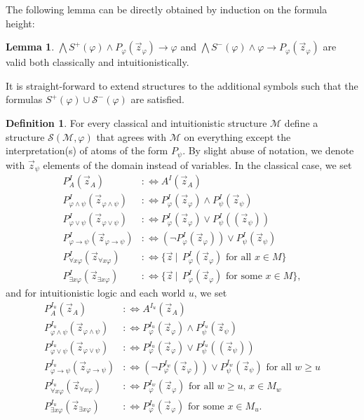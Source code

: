 \documentclass[a4paper,11pt]{report}
\theoremstyle{definition}
\theoremstyle{definition}
\theoremstyle{definition}
\newtheorem{lemma}[theorem]{Lemma}
\theoremstyle{definition}
\theoremstyle{definition}
\newtheorem{definition}[theorem]{Definition}
\theoremstyle{definition}
\theoremstyle{definition}
\begin{document}
	The following lemma can be directly obtained by induction on the formula height:
	
	\begin{lemma}
		$\bigwedge S^+(\varphi)\wedge P_\varphi(\vec z_\varphi)\to\varphi$ and $\bigwedge S^-(\varphi)\wedge \varphi\to P_\varphi(\vec z_\varphi)$ are valid both classically and intuitionistically.
	\end{lemma}
	
	It is straight-forward to extend structures to the additional symbols such that the formulas $S^+(\varphi)\cup\mathcal S^-(\varphi)$ are satisfied.
	\begin{definition}
		For every classical and intuitionistic structure $\mathcal M$ define a structure $\mathcal S(\mathcal M,\varphi)$ that agrees with $\mathcal M$ on everything except the interpretation(s) of atoms of the form $P_\psi$. By slight abuse of notation, we denote with $\vec z_\psi$ elements of the domain instead of variables. In the classical case, we set
		\begin{align*}
			P_A^I(\vec z_A)&:\Leftrightarrow A^I(\vec z_A)\\
			P_{\varphi\wedge\psi}^I(\vec z_{\varphi\wedge\psi}) &:\Leftrightarrow P_{\varphi}^I(\vec z_\varphi)\wedge P_{\psi}^I(\vec z_\psi)\\ P_{\varphi\vee\psi}^I(\vec z_{\varphi\vee\psi}) &:\Leftrightarrow P_{\varphi}^I(\vec z_\varphi)\vee P_{\psi}^I((\vec z_\psi))\\P_{\varphi\to\psi}^I(\vec z_{\varphi\to\psi}) &:\Leftrightarrow (\neg P_{\varphi}^I(\vec z_{\varphi}))\vee P_{\psi}^I(\vec z_{\psi})\\P_{\forall x\varphi}^I(\vec z_{\forall x\varphi}) &:\Leftrightarrow \{\vec z\:|\:\:P_{\varphi}^I(\vec z_\varphi) \text{ for all $x\in M$}\}\\ P_{\exists x\varphi}^I(\vec z_{\exists x\varphi}) &:\Leftrightarrow \{\vec z\:|\:\:P_{\varphi}^I(\vec z_\varphi) \text{ for some $x\in M$}\},
		\end{align*}
		and for intuitionistic logic and each world $u$, we set
		\begin{align*}
			P_A^{I_u}(\vec z_A)&:\Leftrightarrow A^{I_u}(\vec z_A)\\
			P_{\varphi\wedge\psi}^{I_u}(\vec z_{\varphi\wedge\psi}) &:\Leftrightarrow P_{\varphi}^{I_u}(\vec z_\varphi)\wedge P_{\psi}^{I_u}(\vec z_\psi)\\ P_{\varphi\vee\psi}^{I_u}(\vec z_{\varphi\vee\psi}) &:\Leftrightarrow P_{\varphi}^{I_u}(\vec z_\varphi)\vee P_{\psi}^{I_u}((\vec z_\psi))\\
			P_{\varphi\to\psi}^{I_u}(\vec z_{\varphi\to\psi}) &:\Leftrightarrow(\neg P_{\varphi}^{I_w}(\vec z_{\varphi}))\vee P_{\psi}^{I_w}(\vec z_{\psi})\text{ for all $w\geq u$}\\
			P_{\forall x\varphi}^{I_u}(\vec z_{\forall x\varphi}) &:\Leftrightarrow P_{\varphi}^{I_w}(\vec z_\varphi) \text{ for all $w\geq u$, $x\in M_w$}\\ P_{\exists x\varphi}^{I_u}(\vec z_{\exists x\varphi}) &:\Leftrightarrow P_{\varphi}^{I_u}(\vec z_\varphi) \text{ for some $x\in M_u$}.
		\end{align*}
	\end{definition}
\end{document}
